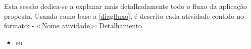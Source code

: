 Esta sessão dedica-se a explanar mais detalhadamente todo o fluxo da aplicação proposta. Usando como base a \autoref{diagfluxo}, é descrito cada atividade contido no formato: - <Nome atividade>: Detalhamento.

\begin{itemize}
	\item eu
\end{itemize}
